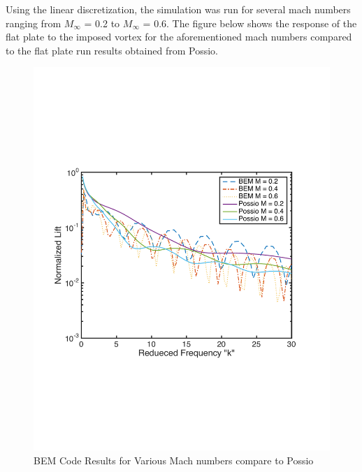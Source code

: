 \documentclass{article}
\begin{document}
\newpage
\noindent Using the linear discretization, the simulation was run for several mach numbers ranging from $M_{\infty}$ = 0.2 to  $M_{\infty}$ = 0.6. The figure below shows the response of the flat plate to the imposed vortex for the aforementioned mach numbers compared to the flat plate run results obtained from Possio.

\begin{figure}[h]
\includegraphics[width = 4 in, height = 3 in]{MachSweep_Compare}
\centering
\caption{BEM Code Results for Various Mach numbers compare to Possio}
\end{figure}
\end{document}
